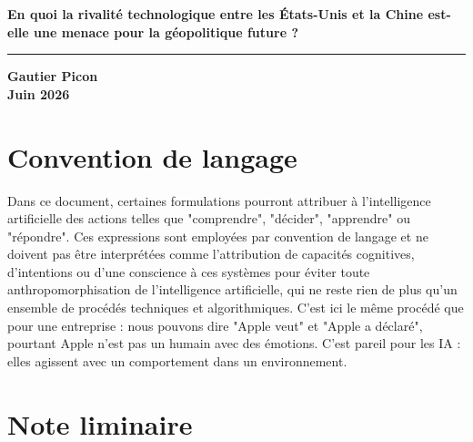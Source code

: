 \documentclass[12pt,a4paper]{article}
\begin{document}
\sloppy

\begin{titlepage}

    \centering

    \vspace*{2cm}

    {\Huge\bfseries\color{bleu}
    En quoi la rivalité technologique entre les États-Unis et la Chine est-elle une menace pour la géopolitique future ?\par}

    \vspace{1cm}

    \rule{15cm}{0.4pt}

    \vspace{1cm}

    {\large
    \textbf{Gautier Picon}\\[0.3cm]
    \textbf{Juin 2026}
    }

\end{titlepage}

\tableofcontents
\newpage

\section*{Convention de langage}

Dans ce document, certaines formulations pourront attribuer à l'intelligence artificielle des actions telles que "comprendre", "décider", "apprendre" ou "répondre". Ces expressions sont employées par convention de langage et ne doivent pas être interprétées comme l'attribution de capacités cognitives, d'intentions ou d'une conscience à ces systèmes pour éviter toute anthropomorphisation de l'intelligence artificielle, qui ne reste rien de plus qu'un ensemble de procédés techniques et algorithmiques. C'est ici le même procédé que pour une entreprise : nous pouvons dire "Apple veut" et "Apple a déclaré", pourtant Apple n'est pas un humain avec des émotions. C'est pareil pour les IA : elles agissent avec un comportement dans un environnement.

\section*{Note liminaire}
\end{document}
